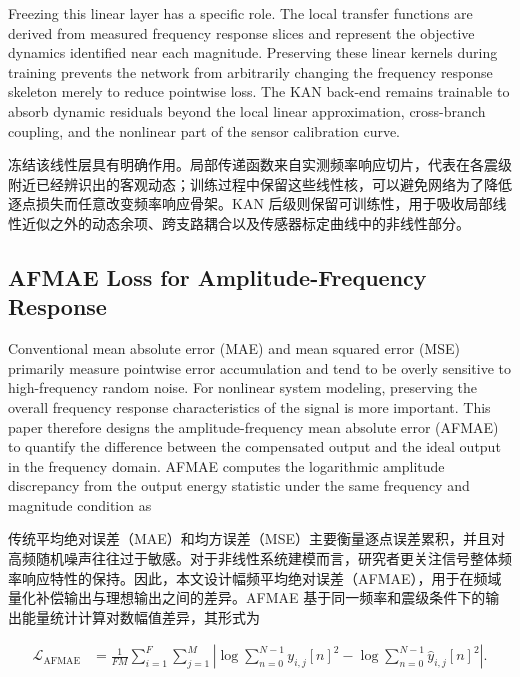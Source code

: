 \documentclass[sn-nature]{sn-jnl}
\newif\ifCNENEnglish
\newif\ifCNENBilingual
\newcommand{\CNEN}[2]{%
    \ifCNENBilingual
        #1%
        \if\relax\detokenize{#2}\relax\else\par #2\fi%
    \else
        \ifCNENEnglish
            #2%
        \else
            #1%
        \fi
    \fi
}
\newcommand{\fidx}{i} %
\newcommand{\fmax}{F} %
\newcommand{\midx}{j} %
\newcommand{\mmax}{M} %
\newcommand{\pidx}{n} %
\newcommand{\pmax}{N} %
\begin{document}
\CNEN{冻结该线性层具有明确作用。局部传递函数来自实测频率响应切片，代表在各震级附近已经辨识出的客观动态；训练过程中保留这些线性核，可以避免网络为了降低逐点损失而任意改变频率响应骨架。KAN 后级则保留可训练性，用于吸收局部线性近似之外的动态余项、跨支路耦合以及传感器标定曲线中的非线性部分。}{Freezing this linear layer has a specific role. The local transfer functions are derived from measured frequency response slices and represent the objective dynamics identified near each magnitude. Preserving these linear kernels during training prevents the network from arbitrarily changing the frequency response skeleton merely to reduce pointwise loss. The KAN back-end remains trainable to absorb dynamic residuals beyond the local linear approximation, cross-branch coupling, and the nonlinear part of the sensor calibration curve.}

\subsection{AFMAE Loss for Amplitude-Frequency Response}

\CNEN{传统平均绝对误差（MAE）和均方误差（MSE）主要衡量逐点误差累积，并且对高频随机噪声往往过于敏感。对于非线性系统建模而言，研究者更关注信号整体频率响应特性的保持。因此，本文设计幅频平均绝对误差（AFMAE），用于在频域量化补偿输出与理想输出之间的差异。AFMAE 基于同一频率和震级条件下的输出能量统计计算对数幅值差异，其形式为}{Conventional mean absolute error (MAE) and mean squared error (MSE) primarily measure pointwise error accumulation and tend to be overly sensitive to high-frequency random noise. For nonlinear system modeling, preserving the overall frequency response characteristics of the signal is more important. This paper therefore designs the amplitude-frequency mean absolute error (AFMAE) to quantify the difference between the compensated output and the ideal output in the frequency domain. AFMAE computes the logarithmic amplitude discrepancy from the output energy statistic under the same frequency and magnitude condition as%
}

\begin{equation}
    \begin{aligned}
        \mathcal{L}_{\text{AFMAE}} & =  \frac{1}{\fmax\mmax} \sum_{\fidx=1}^{\fmax} \sum_{\midx=1}^{\mmax}        \left|
        \log \sum_{\pidx=0}^{\pmax-1}y_{\fidx,\midx}[n]^2
        - \log \sum_{\pidx=0}^{\pmax-1}\hat{y}_{\fidx,\midx}[n]^2
        \right|.
    \end{aligned}
    \label{eq:AFMAE_loss2}
\end{equation}
\end{document}
